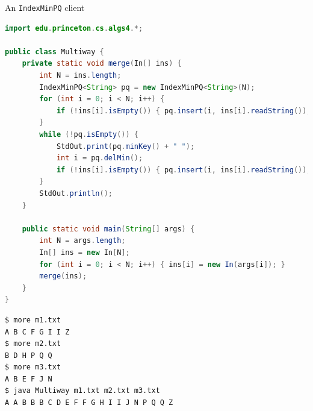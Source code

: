 \documentclass[8pt,a4paper,compress]{beamer}
\begin{document}
\begin{frame}[fragile]
\pause

An \lstinline{IndexMinPQ} client
\begin{lstlisting}[language=Java]
import edu.princeton.cs.algs4.*;

public class Multiway { 
    private static void merge(In[] ins) { 
        int N = ins.length; 
        IndexMinPQ<String> pq = new IndexMinPQ<String>(N); 
        for (int i = 0; i < N; i++) { 
            if (!ins[i].isEmpty()) { pq.insert(i, ins[i].readString()); }
        } 
        while (!pq.isEmpty()) {
            StdOut.print(pq.minKey() + " "); 
            int i = pq.delMin(); 
            if (!ins[i].isEmpty()) { pq.insert(i, ins[i].readString()); }
        }
        StdOut.println();
    } 

    public static void main(String[] args) { 
        int N = args.length; 
        In[] ins = new In[N]; 
        for (int i = 0; i < N; i++) { ins[i] = new In(args[i]); } 
        merge(ins); 
    } 
} 
\end{lstlisting}

\pause

\begin{lstlisting}[language={}]
$ more m1.txt 
A B C F G I I Z
$ more m2.txt 
B D H P Q Q
$ more m3.txt 
A B E F J N
$ java Multiway m1.txt m2.txt m3.txt 
A A B B B C D E F F G H I I J N P Q Q Z 
\end{lstlisting}
\end{frame}
\end{document}
